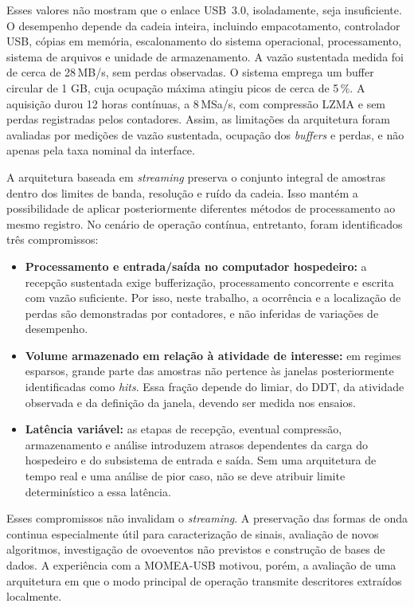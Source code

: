 Esses valores não mostram que o enlace USB~3.0, isoladamente, seja insuficiente. O desempenho depende da cadeia inteira, incluindo empacotamento, controlador USB, cópias em memória, escalonamento do sistema operacional, processamento, sistema de arquivos e unidade de armazenamento. A vazão sustentada medida foi de cerca de 28\,MB/s, sem perdas observadas. O sistema emprega um buffer circular de 1 GB, cuja ocupação máxima atingiu picos de cerca de 5\,\%. A aquisição durou 12 horas contínuas, a 8\,MSa/s, com compressão LZMA e sem perdas registradas pelos contadores. Assim, as limitações da arquitetura foram avaliadas por medições de vazão sustentada, ocupação dos \textit{buffers} e perdas, e não apenas pela taxa nominal da interface.

A arquitetura baseada em \textit{streaming} preserva o conjunto integral de amostras dentro dos limites de banda, resolução e ruído da cadeia. Isso mantém a possibilidade de aplicar posteriormente diferentes métodos de processamento ao mesmo registro. No cenário de operação contínua, entretanto, foram identificados três compromissos:

\begin{itemize}
	\item \textbf{Processamento e entrada/saída no computador hospedeiro:} a recepção sustentada exige bufferização, processamento concorrente e escrita com vazão suficiente. Por isso, neste trabalho, a ocorrência e a localização de perdas são demonstradas por contadores, e não inferidas de variações de desempenho.
	
	\item \textbf{Volume armazenado em relação à atividade de interesse:} em regimes esparsos, grande parte das amostras não pertence às janelas posteriormente identificadas como \textit{hits}. Essa fração depende do limiar, do DDT, da atividade observada e da definição da janela, devendo ser medida nos ensaios.
	
	\item \textbf{Latência variável:} as etapas de recepção, eventual compressão, armazenamento e análise introduzem atrasos dependentes da carga do hospedeiro e do subsistema de entrada e saída. Sem uma arquitetura de tempo real e uma análise de pior caso, não se deve atribuir limite determinístico a essa latência.
\end{itemize}

Esses compromissos não invalidam o \textit{streaming}. A preservação das formas de onda continua especialmente útil para caracterização de sinais, avaliação de novos algoritmos, investigação de 
ovo{eventos} não previstos e construção de bases de dados. A experiência com a MOMEA-USB motivou, porém, a avaliação de uma arquitetura em que o modo principal de operação transmite descritores extraídos localmente.

